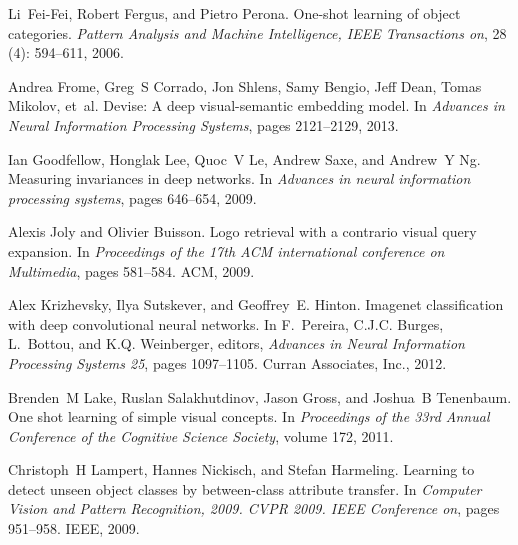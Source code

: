 \documentclass{bmvc2k}
\begin{document}
\begin{thebibliography}{23}
Li~Fei-Fei, Robert Fergus, and Pietro Perona.
\newblock One-shot learning of object categories.
\newblock \emph{Pattern Analysis and Machine Intelligence, IEEE Transactions
  on}, 28 (4): 594--611, 2006.

Andrea Frome, Greg~S Corrado, Jon Shlens, Samy Bengio, Jeff Dean, Tomas
  Mikolov, et~al.
\newblock Devise: A deep visual-semantic embedding model.
\newblock In \emph{Advances in Neural Information Processing Systems}, pages
  2121--2129, 2013.

Ian Goodfellow, Honglak Lee, Quoc~V Le, Andrew Saxe, and Andrew~Y Ng.
\newblock Measuring invariances in deep networks.
\newblock In \emph{Advances in neural information processing systems}, pages
  646--654, 2009.

Alexis Joly and Olivier Buisson.
\newblock Logo retrieval with a contrario visual query expansion.
\newblock In \emph{Proceedings of the 17th ACM international conference on
  Multimedia}, pages 581--584. ACM, 2009.

Alex Krizhevsky, Ilya Sutskever, and Geoffrey~E. Hinton.
\newblock Imagenet classification with deep convolutional neural networks.
\newblock In F.~Pereira, C.J.C. Burges, L.~Bottou, and K.Q. Weinberger,
  editors, \emph{Advances in Neural Information Processing Systems 25}, pages
  1097--1105. Curran Associates, Inc., 2012.

Brenden~M Lake, Ruslan Salakhutdinov, Jason Gross, and Joshua~B Tenenbaum.
\newblock One shot learning of simple visual concepts.
\newblock In \emph{Proceedings of the 33rd Annual Conference of the Cognitive
  Science Society}, volume 172, 2011.

Christoph~H Lampert, Hannes Nickisch, and Stefan Harmeling.
\newblock Learning to detect unseen object classes by between-class attribute
  transfer.
\newblock In \emph{Computer Vision and Pattern Recognition, 2009. CVPR 2009.
  IEEE Conference on}, pages 951--958. IEEE, 2009.


\end{thebibliography}
\end{document}

